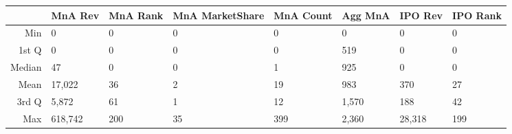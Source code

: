 \begin{table}[ht]
\centering
\begin{tabular}{rlllllll}
  \hline
 & MnA Rev & MnA  Rank & MnA MarketShare & MnA Count & Agg MnA  & IPO Rev & IPO  Rank \\ 
  \hline
Min & 0 & 0 & 0 & 0 & 0 & 0 & 0 \\ 
  1st Q & 0 & 0 & 0 & 0 & 519 & 0 & 0 \\ 
  Median & 47 & 0 & 0 & 1 & 925 & 0 & 0 \\ 
  Mean & 17,022 & 36 & 2 & 19 & 983 & 370 & 27 \\ 
  3rd Q & 5,872 & 61 & 1 & 12 & 1,570 & 188 & 42 \\ 
  Max & 618,742 & 200 & 35 & 399 & 2,360 & 28,318 & 199 \\ 
   \hline
\end{tabular}
\end{table}
